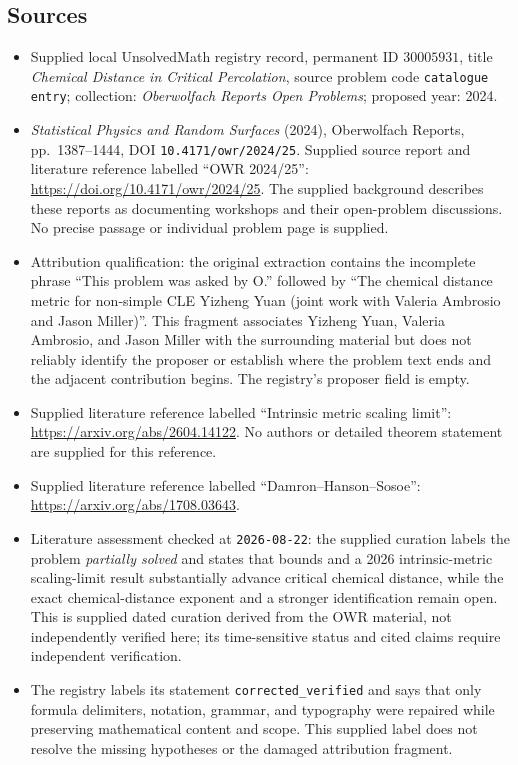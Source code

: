 \documentclass[11pt]{article}
\begin{document}
\subsection{Sources}
\begin{itemize}
\item Supplied local UnsolvedMath registry record, permanent ID \(30005931\), title \emph{Chemical Distance in Critical Percolation}, source problem code \texttt{catalogue entry}; collection: \emph{Oberwolfach Reports Open Problems}; proposed year: 2024.
\item \emph{Statistical Physics and Random Surfaces} (2024), Oberwolfach Reports, pp.\ 1387--1444, DOI \texttt{10.4171/owr/2024/25}. Supplied source report and literature reference labelled ``OWR 2024/25'': \url{https://doi.org/10.4171/owr/2024/25}. The supplied background describes these reports as documenting workshops and their open-problem discussions. No precise passage or individual problem page is supplied.
\item Attribution qualification: the original extraction contains the incomplete phrase ``This problem was asked by O.'' followed by ``The chemical distance metric for non-simple CLE Yizheng Yuan (joint work with Valeria Ambrosio and Jason Miller)''. This fragment associates Yizheng Yuan, Valeria Ambrosio, and Jason Miller with the surrounding material but does not reliably identify the proposer or establish where the problem text ends and the adjacent contribution begins. The registry's proposer field is empty.
\item Supplied literature reference labelled ``Intrinsic metric scaling limit'': \url{https://arxiv.org/abs/2604.14122}. No authors or detailed theorem statement are supplied for this reference.
\item Supplied literature reference labelled ``Damron--Hanson--Sosoe'': \url{https://arxiv.org/abs/1708.03643}.
\item Literature assessment checked at \texttt{2026-08-22}: the supplied curation labels the problem \emph{partially solved} and states that bounds and a 2026 intrinsic-metric scaling-limit result substantially advance critical chemical distance, while the exact chemical-distance exponent and a stronger identification remain open. This is supplied dated curation derived from the OWR material, not independently verified here; its time-sensitive status and cited claims require independent verification.
\item The registry labels its statement \texttt{corrected\_verified} and says that only formula delimiters, notation, grammar, and typography were repaired while preserving mathematical content and scope. This supplied label does not resolve the missing hypotheses or the damaged attribution fragment.
\end{itemize}
\end{document}
